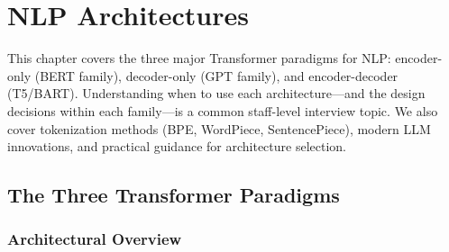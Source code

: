\chapter{NLP Architectures}
\label{chap:nlp_architectures}

\begin{tldr}
This chapter covers the three major Transformer paradigms for NLP: encoder-only (BERT family), decoder-only (GPT family), and encoder-decoder (T5/BART). Understanding when to use each architecture—and the design decisions within each family—is a common staff-level interview topic. We also cover tokenization methods (BPE, WordPiece, SentencePiece), modern LLM innovations, and practical guidance for architecture selection.
\end{tldr}

\section{The Three Transformer Paradigms}
\label{sec:transformer_paradigms}

\subsection{Architectural Overview}

